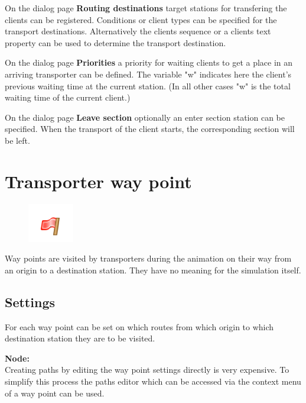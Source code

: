 On the dialog page \textbf{Routing destinations} target stations for transfering the
clients can be registered. Conditions or client types can be specified for the transport
destinations. Alternatively the clients sequence or a clients text property can be used to determine
the transport destination.

On the dialog page \textbf{Priorities} a priority for waiting clients
to get a place in an arriving transporter can be defined.
The variable "w" indicates here the client's previous waiting time at the current station.
(In all other cases "w" is the total waiting time of the current client.)

On the dialog page \textbf{Leave section} optionally an enter section station can be specified.
When the transport of the client starts, the corresponding section will be left.


\section{Transporter way point}
\label{ref:ModelElementWayPoint}

\begin{figure}
\vspace{-22pt}
\includegraphics[width=2cm]{imageModelElementWayPoint.png}
\vspace{-22pt}
\end{figure}

Way points are visited by transporters during the animation on their way from an 
origin to a destination station. They have no meaning for the simulation itself.

\subsection*{Settings}

For each way point can be set on which routes from which origin to which
destination station they are to be visited.

\textbf{Node:}~\\
Creating paths by editing the way point settings directly is very expensive.
To simplify this process the paths editor 
which can be accessed via the context menu of a way point can be used.





